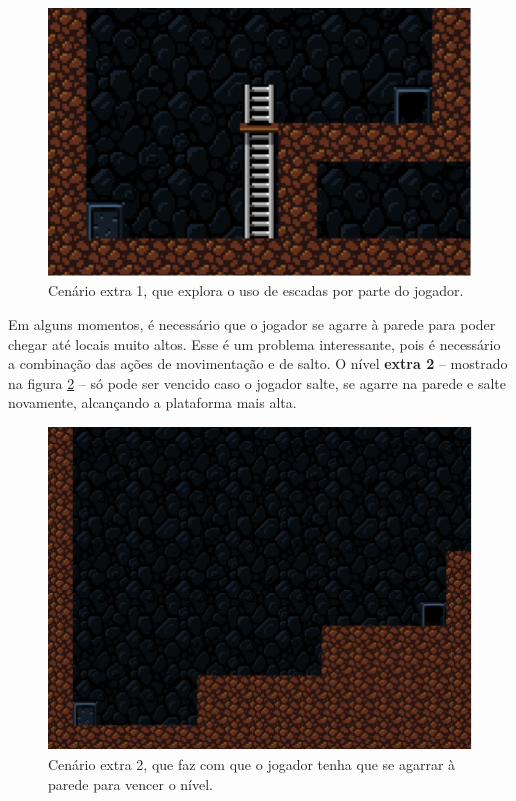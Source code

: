 \begin{figure}[H]
\centering
\includegraphics[width=\textwidth / 2]{fig/levels/extra1.pdf}
\caption{Cenário extra 1, que explora o uso de escadas por parte do jogador.}
\label{fig:extra1}
\end{figure}

Em alguns momentos, é necessário que o jogador se agarre à parede para poder
chegar até locais muito altos. Esse é um problema interessante, pois é
necessário a combinação das ações de movimentação e de salto. O nível
\textbf{extra 2} -- mostrado na figura \ref{fig:extra2} -- só pode ser vencido
caso o jogador salte, se agarre na parede e salte novamente, alcançando a
plataforma mais alta.

\begin{figure}[H]
\centering
\includegraphics[width=\textwidth / 2]{fig/levels/extra2.pdf}
\caption{Cenário extra 2, que faz com que o jogador tenha que se agarrar à
    parede para vencer o nível.}
\label{fig:extra2}
\end{figure}


